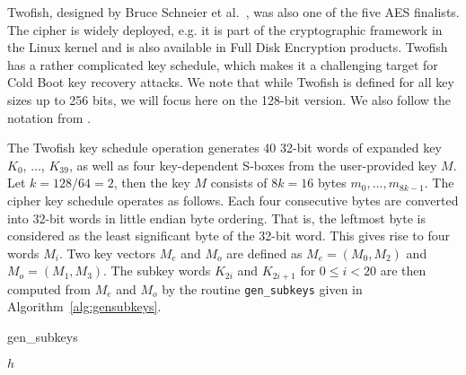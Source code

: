 Twofish, designed by Bruce Schneier et al.\ \cite{twofish}, was also one of the five AES finalists. The cipher is widely deployed, e.g. it is part of the cryptographic framework in the Linux kernel and is also available in Full Disk Encryption products. Twofish has a rather complicated key schedule, which makes it a challenging target for Cold Boot key recovery attacks. 
We note that while Twofish is defined for all key sizes up to 256 bits, we will focus here on the 128-bit version. We also follow the notation from \cite{twofish}.

The Twofish key schedule operation generates 40 32-bit words of expanded key $K_0$, $\dots$, $K_{39}$, as well as four key-dependent S-boxes from the user-provided key $M$. Let $k=128/64=2$, then the key $M$ consists of $8k = 16$ bytes $m_0, \dots, m_{8k-1}$. The cipher key schedule operates as follows. Each four consecutive bytes are converted into 32-bit words in little endian byte ordering. That is, the leftmost byte is considered as the least significant byte of the 32-bit word. This gives rise to four words $M_i$. Two key vectors $M_e$ and $M_o$ are defined as $M_e = (M_0,M_2)$ and $M_o = (M_1,M_3)$. The subkey words $K_{2i}$ and $K_{2i+1}$ for $0 \leq i < 20$ are then computed from $M_e$ and $M_o$ by the routine \verb|gen_subkeys| given in Algorithm~\ref{alg:gensubkeys}.

\begin{algorithm}[htbp]
\SetLine
{}
\caption{gen\_subkeys}
\label{alg:gensubkeys}
\end{algorithm}

\begin{algorithm}[htbp]
\SetLine
{}
\caption{$h$}
\label{alg:h}
\end{algorithm}

